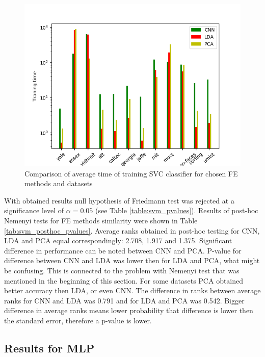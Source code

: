 \documentclass[a4paper, 10 pt, journal]{ieeeconf}
\begin{document}
\begin{figure}[!h]
    \centering
    \includegraphics[scale=0.875]{images/Svm_fit_time_comparison.png}
    \caption{Comparison of average time of training SVC classifier for chosen FE methods and datasets}
    \label{fig:svm_fit_time_comparision}
\end{figure}

\newpage

With obtained results null hypothesis of Friedmann test was rejected at a significance level of $\alpha = 0.05$ (see Table \ref{table:svm_pvalues}). 
Results of post-hoc Nemenyi tests for FE methods similarity were shown in Table \ref{tab:svm_posthoc_pvalues}. 
Average ranks obtained in post-hoc testing for CNN, LDA and PCA equal correspondingly: 2.708, 1.917 and 1.375.
Significant difference in performance can be noted between CNN and PCA.
P-value for difference between CNN and LDA was lower then for LDA and PCA, what might be confusing. This is connected to the problem with Nemenyi test that was mentioned in the beginning of this section. For some datasets PCA obtained better accuracy then LDA, or even CNN. The difference in ranks between average ranks for CNN and LDA was 0.791 and for LDA and PCA was 0.542. Bigger difference in average ranks means lower probability that difference is lower then the standard error, therefore a p-value is lower. 

\newpage

\subsection{Results for MLP}
\end{document}
